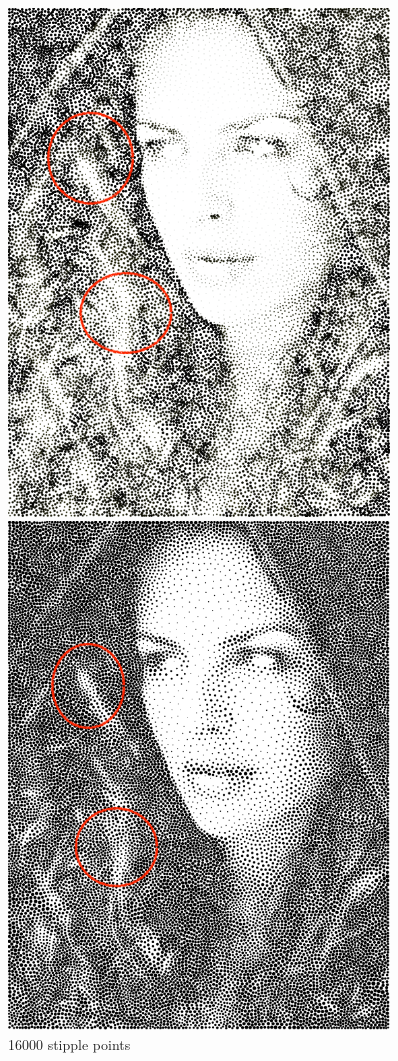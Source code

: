 \documentclass[11pt]{article}
\begin{document}
\begin{figure}[htbp]
\centering
\begin{minipage}[t]{0.48\textwidth}
\centering
\includegraphics[width = 0.9\textwidth]{fairyeyes-16000.png}
\caption{16000 stipple points}
\end{minipage}
\begin{minipage}[t]{0.48\textwidth}
\centering
\includegraphics[width = 0.9\textwidth]{f_vor_16000.png}

\end{minipage}
\end{figure}
\end{document}
